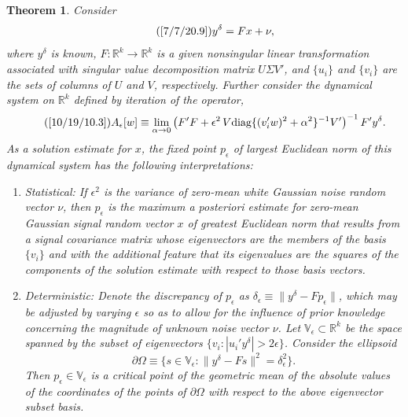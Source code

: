 \documentclass{amsart}
\numberwithin{equation}{section}
\newtheorem{theorem}{Theorem}
\theoremstyle{definition}
\numberwithin{theorem}{section}
\begin{document}
 \begin{theorem} \label{7/6/21.6} Consider \begin{equation} \tag{\ref{7/7/20.9}} y^\delta = F x +\nu, \end{equation} where $y^\delta$ is known, $F:\mathbb{R}^k\rightarrow\mathbb{R}^k$ is a given nonsingular linear transformation associated with singular value decomposition matrix $U\Sigma V'$, and $\{u_i\}$ and $\{v_i\}$ are the sets of columns of $U$ and $V$, respectively.  Further consider the dynamical system on $\mathbb{R}^k$ defined by iteration of the operator, \begin{equation}\tag{\ref{10/19/10.3}} A_\epsilon[w] \equiv \lim_{\alpha\rightarrow 0}\left(F'F+\epsilon^2\, V\mbox{\rm diag}\{(v_i'w)^2 + \alpha^2\}^{-1}V' \right)^{-1} F'y^\delta. \end{equation} 
As a solution estimate for $x$, the fixed point $p_\epsilon$ of largest Euclidean norm of this dynamical system  has the following interpretations:
\begin{enumerate}\item {\rm Statistical:} If $\epsilon^2$ is the variance of zero-mean white Gaussian noise random vector $\nu$, then 
$p_\epsilon$ is the  {\rm maximum a posteriori} estimate for zero-mean Gaussian signal random vector $x$ of greatest Euclidean norm
 that results from a signal covariance matrix  whose eigenvectors are the members of the basis $\{v_i\}$ and with the additional feature that its eigenvalues are the squares of the components of the solution estimate with respect to those basis vectors.  \item  
{\rm Deterministic:} Denote the discrepancy of $p_\epsilon$ as $\delta_\epsilon \equiv \| y^\delta - Fp_\epsilon\|$, which may be adjusted by varying $\epsilon$ so as to allow for the influence of prior knowledge concerning the magnitude of unknown noise vector $\nu$.  Let $\mathbb{V}_\epsilon \subset \mathbb{R}^k$ be the space spanned by the subset of eigenvectors $\{v_i: |u_i'y^\delta| > 2\epsilon \}$.  
 Consider the ellipsoid \[ \partial\Omega \equiv \{ s\in \mathbb{V}_\epsilon: \| y^\delta - Fs\|^2 = \delta_\epsilon^2 \}.\]   Then $p_\epsilon\in \mathbb{V}_\epsilon$ is a critical point of the geometric mean of the absolute values of the coordinates of the points of $\partial\Omega$ with respect to the above eigenvector subset basis.
\end{enumerate}
\end{theorem}
\end{document}
